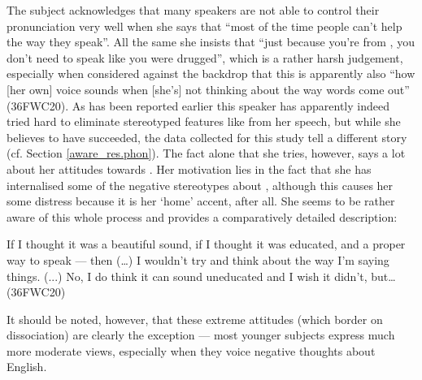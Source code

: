 The subject acknowledges that many speakers are not able to  control their pronunciation very well when she says that ``most of the time people can't help the way they speak''.
All the same she insists that ``just because you're from , you don't need to speak like you were drugged'', which is a rather harsh judgement, especially when considered against the backdrop that this is apparently also ``how [her own] voice sounds when [she's] not thinking about the way words come out'' (36FWC20).
As has been reported earlier this speaker has apparently indeed tried hard to eliminate stereotyped features like  from her speech, but while she believes to have succeeded, the data collected for this study tell a different story (cf. Section \ref{aware_res.phon}).
The fact alone that she tries, however, says a lot about her attitudes towards .
Her motivation lies in the fact that she has internalised some of the negative stereotypes about , although this causes her some distress because it is her `home' accent, after all.
She seems to be rather aware of this whole process and provides a comparatively detailed description:
\begin{example}
	If I thought it was a beautiful sound, if I thought it was educated, and  a proper way to speak --- then (\ldots) I wouldn't try and think about the way I'm saying things. (...) No, I do think it can sound uneducated and I wish it didn't, but\ldots (36FWC20)
\end{example}
It should be noted, however, that these extreme attitudes (which border on dissociation) are clearly the exception --- most younger subjects express much more moderate views, especially when they voice negative thoughts about  English.
